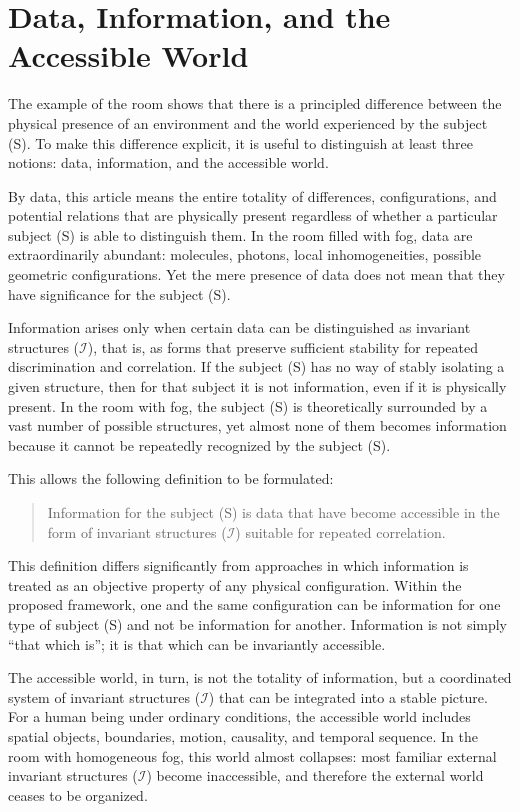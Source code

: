 \documentclass[aps,prd,onecolumn,nofootinbib,superscriptaddress]{revtex4-2}
\begin{document}
\section{Data, Information, and the Accessible World}
The example of the room shows that there is a principled difference between the physical presence of an environment and the world experienced by the subject (S). To make this difference explicit, it is useful to distinguish at least three notions: data, information, and the accessible world.

By data, this article means the entire totality of differences, configurations, and potential relations that are physically present regardless of whether a particular subject (S) is able to distinguish them. In the room filled with fog, data are extraordinarily abundant: molecules, photons, local inhomogeneities, possible geometric configurations. Yet the mere presence of data does not mean that they have significance for the subject (S).

Information arises only when certain data can be distinguished as invariant structures ($\mathcal{I}$), that is, as forms that preserve sufficient stability for repeated discrimination and correlation. If the subject (S) has no way of stably isolating a given structure, then for that subject it is not information, even if it is physically present. In the room with fog, the subject (S) is theoretically surrounded by a vast number of possible structures, yet almost none of them becomes information because it cannot be repeatedly recognized by the subject (S).

This allows the following definition to be formulated:

\begin{quote}
Information for the subject (S) is data that have become accessible in the form of invariant structures ($\mathcal{I}$) suitable for repeated correlation.
\end{quote}

This definition differs significantly from approaches in which information is treated as an objective property of any physical configuration. Within the proposed framework, one and the same configuration can be information for one type of subject (S) and not be information for another. Information is not simply “that which is”; it is that which can be invariantly accessible.

The accessible world, in turn, is not the totality of information, but a coordinated system of invariant structures ($\mathcal{I}$) that can be integrated into a stable picture. For a human being under ordinary conditions, the accessible world includes spatial objects, boundaries, motion, causality, and temporal sequence. In the room with homogeneous fog, this world almost collapses: most familiar external invariant structures ($\mathcal{I}$) become inaccessible, and therefore the external world ceases to be organized.
\end{document}
